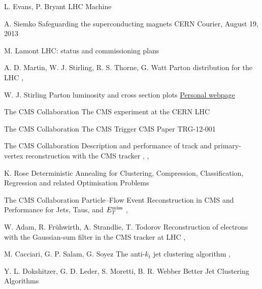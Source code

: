 {L. Evans, P. Bryant}
{LHC Machine}
{}

{A. Siemko}
{Safeguarding the superconducting magnets}
{CERN Courier, August 19, 2013}

{M. Lamont}
{LHC: status and commissioning plans}
{}

{A. D. Martin, W. J. Stirling, R. S. Thorne, G. Watt}
{Parton distribution for the LHC}
{, }

{W. J. Stirling}
{Parton luminosity and cross section plots}
{\href{http://www.hep.ph.ic.ac.uk/~wstirlin/plots/plots.html}{Personal webpage}}

{The CMS Collaboration}
{The CMS experiment at the CERN LHC}
{}

{The CMS Collaboration}
{The CMS Trigger}
{CMS Paper TRG-12-001}

{The CMS Collaboration}
{Description and performance of track and primary-vertex reconstruction with the CMS tracker}
{, , }

{K. Rose}
{Deterministic Annealing for Clustering, Compression, Classification, Regression and related Optimisation Problems}
{}

{The CMS Collaboration}
{Particle–Flow Event Reconstruction in CMS and Performance for Jets, Taus, and $E_T^\text{miss}$}
{, }

{W. Adam, R. Frühwirth, A. Strandlie, T. Todorov}
{Reconstruction of electrons with the Gaussian-sum filter in the CMS tracker at LHC}
{, }

{M. Cacciari, G. P. Salam, G. Soyez}
{The anti-$k_t$ jet clustering algorithm}
{, }

{Y. L. Dokshitzer, G. D. Leder, S. Moretti, B. R. Webber}
{Better Jet Clustering Algorithms}
{ }

